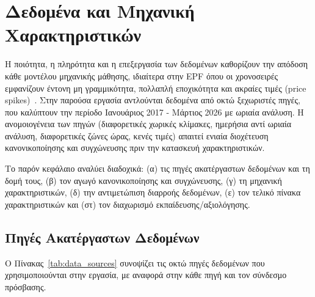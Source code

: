 \chapter[Δεδομένα \& Χαρακτηριστικά]{Δεδομένα και Μηχανική Χαρακτηριστικών}
\label{ch:data}

Η ποιότητα, η πληρότητα και η επεξεργασία των δεδομένων καθορίζουν την
απόδοση κάθε μοντέλου μηχανικής μάθησης, ιδιαίτερα στην EPF όπου οι χρονοσειρές εμφανίζουν
έντονη μη γραμμικότητα, πολλαπλή εποχικότητα και ακραίες τιμές (price spikes)~\cite{kaufman2012leakage}.
Στην παρούσα εργασία αντλούνται δεδομένα από οκτώ ξεχωριστές πηγές, που καλύπτουν την
περίοδο Ιανουάριος 2017 - Μάρτιος 2026 με ωριαία ανάλυση. Η ανομοιογένεια των πηγών
(διαφορετικές χωρικές κλίμακες, ημερήσια αντί ωριαία ανάλυση, διαφορετικές ζώνες ώρας,
κενές τιμές) απαιτεί ενιαία διοχέτευση κανονικοποίησης και συγχώνευσης πριν την κατασκευή
χαρακτηριστικών.

Το παρόν κεφάλαιο αναλύει διαδοχικά: (α) τις πηγές ακατέργαστων δεδομένων και τη δομή
τους, (β) τον αγωγό κανονικοποίησης και συγχώνευσης, (γ) τη μηχανική χαρακτηριστικών,
(δ) την αντιμετώπιση διαρροής δεδομένων, (ε) τον τελικό πίνακα χαρακτηριστικών και
(στ) τον διαχωρισμό εκπαίδευσης/αξιολόγησης.


\section{Πηγές Ακατέργαστων Δεδομένων}
\label{sec:data_sources}

Ο Πίνακας~\ref{tab:data_sources} συνοψίζει τις οκτώ πηγές δεδομένων που
χρησιμοποιούνται στην εργασία, με αναφορά στην κάθε πηγή και τον σύνδεσμο
πρόσβασης.

